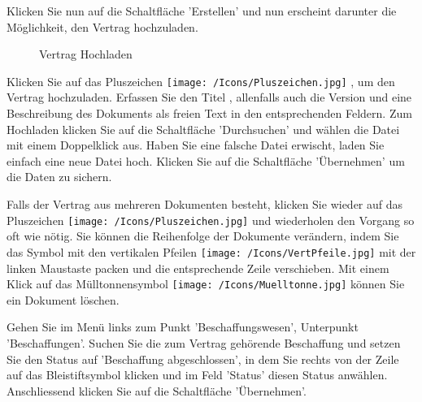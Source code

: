 \vspace{\baselineskip}

Klicken Sie nun auf die Schaltfläche 'Erstellen'  und nun erscheint darunter die Möglichkeit, den Vertrag hochzuladen.

\begin{figure}[H]
\caption{Vertrag Hochladen}
\end{figure}

Klicken Sie auf das Pluszeichen \texttt{[image: /Icons/Pluszeichen.jpg]} , um den Vertrag hochzuladen. Erfassen Sie den Titel , allenfalls auch die Version  und eine Beschreibung des Dokuments  als freien Text in den entsprechenden Feldern. Zum Hochladen klicken Sie auf die Schaltfläche 'Durchsuchen'  und wählen die Datei mit einem Doppelklick aus. Haben Sie eine falsche Datei erwischt, laden Sie einfach eine neue Datei hoch. Klicken Sie auf die Schaltfläche 'Übernehmen'  um die Daten zu sichern.

\vspace{\baselineskip}

Falls der Vertrag aus mehreren Dokumenten besteht, klicken Sie wieder auf das Pluszeichen \texttt{[image: /Icons/Pluszeichen.jpg]}  und wiederholen den Vorgang so oft wie nötig. Sie können die Reihenfolge der Dokumente verändern, indem Sie das Symbol mit den vertikalen Pfeilen \texttt{[image: /Icons/VertPfeile.jpg]}  mit der linken\textcolor{red}{ }Maustaste packen und die entsprechende Zeile verschieben. Mit einem Klick auf das Mülltonnensymbol \texttt{[image: /Icons/Muelltonne.jpg]}  können Sie ein Dokument löschen.

\vspace{\baselineskip}

Gehen Sie im Menü links zum Punkt 'Beschaffungswesen', Unterpunkt 'Beschaffungen'. Suchen Sie die zum Vertrag gehörende Beschaffung und setzen Sie den Status auf 'Beschaffung abgeschlossen', in dem Sie rechts von der Zeile auf das Bleistiftsymbol klicken und im Feld 'Status' diesen Status anwählen. Anschliessend klicken Sie auf die Schaltfläche 'Übernehmen'.

